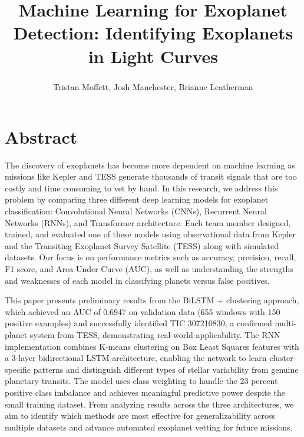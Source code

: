 \documentclass[letterpaper]{article} %
\title{Machine Learning for Exoplanet Detection: Identifying Exoplanets in Light Curves}
\author {
    Tristan Moffett\textsuperscript{\rm },
    Josh Manchester\textsuperscript{\rm },
    Brianne Leatherman\textsuperscript{\rm }
}
\begin{document}
\maketitle

\section*{Abstract}
The discovery of exoplanets has become more dependent on machine learning as missions like Kepler and TESS generate thousands of transit signals that are too costly and time consuming to vet by hand. In this research, we address this problem by comparing three different deep learning models for exoplanet classification: Convolutional Neural Networks (CNNs), Recurrent Neural Networks (RNNs), and Transformer architecture. Each team member designed, trained, and evaluated one of these models using observational data from Kepler and the Transiting Exoplanet Survey Satellite (TESS) along with simulated datasets. Our focus is on performance metrics such as accuracy, precision, recall, F1 score, and Area Under Curve (AUC), as well as understanding the strengths and weaknesses of each model in classifying planets versus false positives.

This paper presents preliminary results from the BiLSTM + clustering approach, which achieved an AUC of 0.6947 on validation data (655 windows with 150 positive examples) and successfully identified TIC 307210830, a confirmed multi-planet system from TESS, demonstrating real-world applicability. The RNN implementation combines K-means clustering on Box Least Squares features with a 3-layer bidirectional LSTM architecture, enabling the network to learn cluster-specific patterns and distinguish different types of stellar variability from genuine planetary transits. The model uses class weighting to handle the 23 percent positive class imbalance and achieves meaningful predictive power despite the small training dataset. From analyzing results across the three architectures, we aim to identify which methods are most effective for generalizability across multiple datasets and advance automated exoplanet vetting for future missions.
\end{document}
